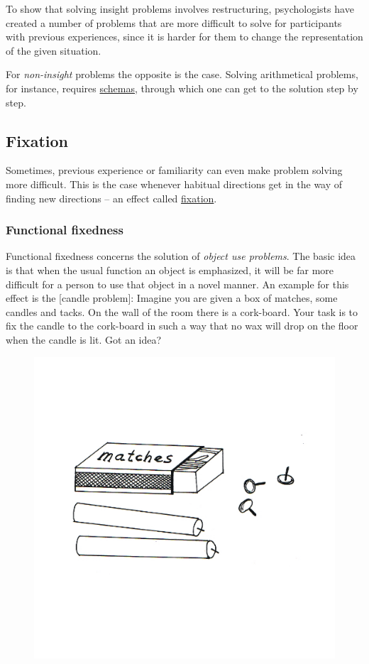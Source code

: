 \documentclass[
]{krantz}
\begin{document}
To show that solving insight problems involves restructuring, psychologists have created a number of problems that are more difficult to solve for participants with previous experiences, since it is harder for them to change the representation of the given situation.

For \emph{non-insight} problems the opposite is the case. Solving arithmetical problems, for instance, requires \protect\hyperlink{schemas}{schemas}, through which one can get to the solution step by step.

\hypertarget{fixation}{%
\subsection*{Fixation}\label{fixation}}


Sometimes, previous experience or familiarity can even make problem solving more difficult. This is the case whenever habitual directions get in the way of finding new directions -- an effect called \protect\hyperlink{fixation}{fixation}.

\hypertarget{functional-fixedness}{%
\subsubsection*{Functional fixedness}\label{functional-fixedness}}


Functional fixedness concerns the solution of \emph{object use problems}. The basic idea is that when the usual function an object is emphasized, it will be far more difficult for a person to use that object in a novel manner. An example for this effect is the {[}candle problem{]}: Imagine you are given a box of matches, some candles and tacks. On the wall of the room there is a cork-board. Your task is to fix the candle to the cork-board in such a way that no wax will drop on the floor when the candle is lit. Got an idea?

\begin{figure}

{\centering \includegraphics[width=0.6\linewidth]{images/ch10/fig2} 

}

\end{figure}
\end{document}
